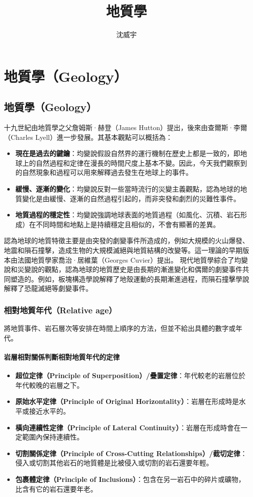 \documentclass[a4paper,12pt]{report}
\begin{document}
\title{地質學}
\author{沈威宇}
\date{\temtoday}
\titletocdoc
\chapter{地質學（Geology）}
\section{地質學（Geology）}
十九世紀由地質學之父詹姆斯·赫登（James Hutton）提出，後來由查爾斯·李爾（Charles Lyell）進一步發展。其基本觀點可以概括為：
\begin{itemize}
\item \textbf{現在是過去的鍵鑰}：均變說假設自然界的運行機制在歷史上都是一致的，即地球上的自然過程和定律在漫長的時間尺度上基本不變。因此，今天我們觀察到的自然現象和過程可以用來解釋過去發生在地球上的事件。
\item \textbf{緩慢、逐漸的變化}：均變說反對一些當時流行的災變主義觀點，認為地球的地質變化是由緩慢、逐漸的自然過程引起的，而非突發和劇烈的災難性事件。
\item \textbf{地質過程的穩定性}：均變說強調地球表面的地質過程（如風化、沉積、岩石形成）在不同時間和地點上是持續穩定且相似的，不會有顯著的差異。
\end{itemize}
認為地球的地質特徵主要是由突發的劇變事件所造成的，例如大規模的火山爆發、地震和隕石撞擊，造成生物的大規模滅絕與地質結構的改變等。這一理論的早期版本由法國地質學家喬治·居維葉（Georges Cuvier）提出。
現代地質學綜合了均變說和災變說的觀點，認為地球的地質歷史是由長期的漸進變化和偶爾的劇變事件共同塑造的。例如，板塊構造學說解釋了地殼運動的長期漸進過程，而隕石撞擊學說解釋了恐龍滅絕等劇變事件。
\subsection{相對地質年代（Relative age）}
將地質事件、岩石層次等安排在時間上順序的方法，但並不給出具體的數字或年代。
\subsubsection{岩層相對關係判斷相對地質年代的定律}
\begin{itemize}
\item \textbf{超位定律（Principle of Superposition）/疊置定律}：年代較老的岩層位於年代較晚的岩層之下。 
\item \textbf{原始水平定律（Principle of Original Horizontality）}：岩層在形成時是水平或接近水平的。 
\item \textbf{橫向連續性定律（Principle of Lateral Continuity）}：岩層在形成時會在一定範圍內保持連續性。 
\item \textbf{切割關係定律（Principle of Cross-Cutting Relationships）/截切定律}：侵入或切割其他岩石的地質體是比被侵入或切割的岩石還要年輕。 
\item \textbf{包裹體定律（Principle of Inclusions）}：包含在另一岩石中的碎片或礦物，比含有它的岩石還要年老。
\end{itemize}
\end{document}
